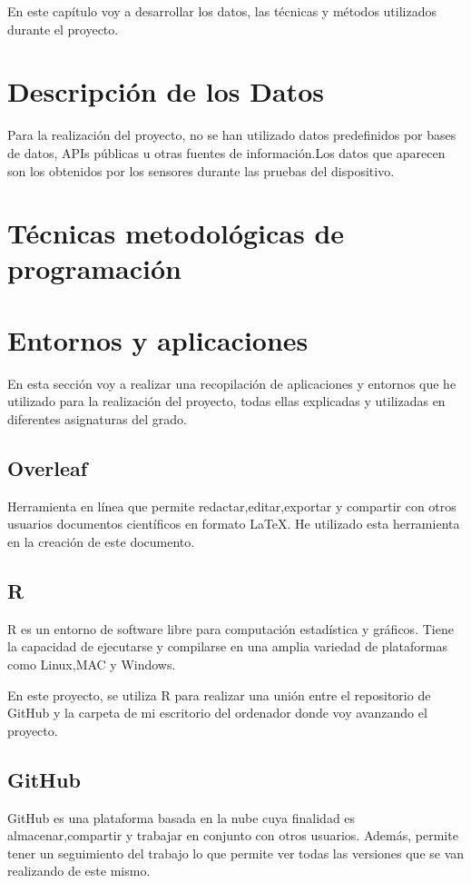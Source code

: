 En este capítulo voy a desarrollar los datos, las técnicas y métodos utilizados durante el proyecto. 
\section{Descripción de los Datos}
Para la realización del proyecto, no se han utilizado datos predefinidos por bases de datos, APIs públicas u otras fuentes de información.Los datos que aparecen son los obtenidos por los sensores durante las pruebas del dispositivo.
\section{Técnicas metodológicas de programación}

\section{Entornos y aplicaciones}
En esta sección voy a realizar una recopilación de aplicaciones y entornos que he utilizado para la realización del proyecto, todas ellas explicadas y utilizadas en diferentes asignaturas del grado.
\subsection{Overleaf}
Herramienta en línea que permite redactar,editar,exportar y compartir con otros usuarios documentos científicos en formato LaTeX.
He utilizado esta herramienta en la creación de este documento.
\subsection{R}
R es un entorno de software libre para computación estadística y gráficos. Tiene la capacidad de ejecutarse y compilarse en una amplia variedad de plataformas como Linux,MAC y Windows.

En este proyecto, se utiliza R para realizar una unión entre el repositorio de GitHub y la carpeta de mi escritorio del ordenador donde voy avanzando el proyecto.
\subsection{GitHub}
GitHub es una plataforma basada en la nube cuya finalidad es almacenar,compartir y trabajar en conjunto con otros usuarios. 
Además, permite tener un seguimiento del trabajo lo que permite ver todas las versiones que se van realizando de este mismo. 

